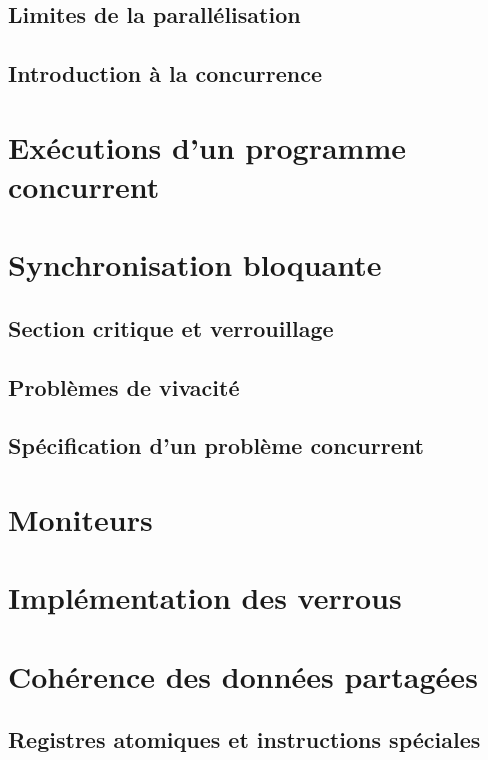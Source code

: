 \subsection{Limites de la parallélisation}

\subsection{Introduction à la concurrence}

 
\section{Exécutions d'un programme concurrent}

 
\section{Synchronisation bloquante}
\subsection{Section critique et verrouillage}

\subsection{Problèmes de vivacité}

\subsection{Spécification d'un problème concurrent}

 
\section{Moniteurs}

 
\section{Implémentation des verrous}

 
\section{Cohérence des données partagées}
\subsection{Registres atomiques et instructions spéciales}

